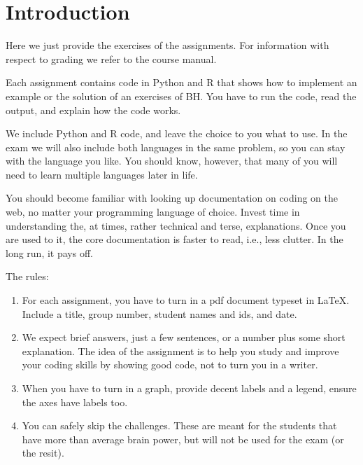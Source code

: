\section*{Introduction}

Here we just provide the exercises of the assignments.  For information with respect to grading we refer to the course manual.

Each assignment contains code in Python and R that shows how to implement an example or the solution of an exercises of BH. You have to run the code, read the output, and explain how the code works.

We include Python and R code, and leave the choice to you what to use.
In the exam we will also include both languages in the same problem, so you can stay with the language you like.
You should know, however, that many of you will need to learn multiple languages later in life.

You should become familiar with looking up documentation on coding on the web, no matter your programming language of choice. Invest time in understanding the, at times, rather technical and terse, explanations.  Once you are used to it, the core documentation is faster to read, i.e., less clutter. In the long run, it pays off.



The rules:
\begin{enumerate}
\item For each assignment, you have to turn in a pdf document typeset in \LaTeX{}. Include a title, group number, student names and ids, and date.
\item We expect brief answers, just a few sentences, or a number plus some short explanation. The idea of the assignment is to help you study and improve your coding skills by showing good code, not to turn you in a writer.
\item When you have to turn in a graph, provide decent labels and a legend, ensure the axes have labels too.
\item You can safely skip the challenges. These are meant for the students that have more than average brain power, but will not be used for the exam (or the resit).
\end{enumerate}
